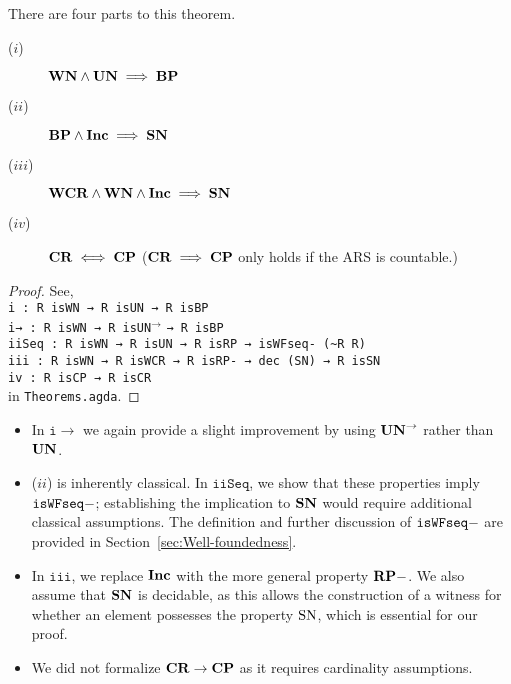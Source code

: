 There are four parts to this theorem. 
\begin{description}
    \item[($i$)] $\mathbf{WN} \land \mathbf{UN} \implies \mathbf{BP}$
    \item[($ii$)] $\mathbf{BP} \land \mathbf{Inc} \implies \mathbf{SN}$  
    \item[($iii$)] $\mathbf{WCR} \land \mathbf{WN} \land \mathbf{Inc} \implies \mathbf{SN}$
    \item[($iv$)] $\mathbf{CR} \iff \mathbf{CP}$ ($\mathbf{CR} \implies \mathbf{CP}$ only holds if the ARS is countable.)
\end{description}
\begin{proof}
    See, \\
    \verb|i : R isWN → R isUN → R isBP|\\
    \verb|i→ : R isWN → R |\texttt{isUN}$^{\to}$ \verb|→ R isBP|\\
    \verb|iiSeq : R isWN → R isUN → R isRP → isWFseq- (~R R)|\\
    \verb|iii : R isWN → R isWCR → R isRP- → dec (SN) → R isSN|\\
    \verb|iv : R isCP → R isCR| \\
    in \texttt{Theorems.agda}.
\end{proof}

\begin{remark} \hfill
    \begin{itemize}        
        \item In $\mathtt{i\to}$ we again provide a slight improvement by using $\mathbf{UN}^{\to}$ rather than $\mathbf{UN}$.
        \item ($ii$) is inherently classical. In $\mathtt{iiSeq}$, we show that these properties imply $\mathtt{isWFseq-}$; establishing the implication to $\mathbf{SN}$ would require additional classical assumptions. The definition and further discussion of $\mathtt{isWFseq-}$ are provided in Section~\ref{sec:Well-foundedness}. 
        \item In $\mathtt{iii}$, we replace $\mathbf{Inc}$ with the more general property $\mathbf{RP{-}}$. We also assume that $\mathbf{SN}$ is decidable, as this allows the construction of a witness for whether an element possesses the property $\mathrm{SN}$, which is essential for our proof.
        \item We did not formalize $\mathbf{CR} \to \mathbf{CP}$ as it requires cardinality assumptions.
    \end{itemize}
\end{remark}




